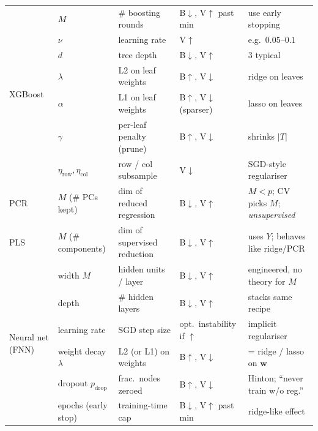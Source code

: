 {\begin{center}
\begin{tabular*}{\textwidth}{@{\extracolsep{\fill}} l l l l l @{}}
\multirow{7}{*}{XGBoost}
                   & $M$                 & \# boosting rounds           & B$\downarrow$, V$\uparrow$ past min  & use early stopping \\
                   & $\nu$               & learning rate                & V$\uparrow$                          & e.g.\ $0.05$--$0.1$ \\
                   & $d$                 & tree depth                   & B$\downarrow$, V$\uparrow$           & $3$ typical \\
                   & $\lambda$           & L2 on leaf weights           & B$\uparrow$, V$\downarrow$           & ridge on leaves \\
                   & $\alpha$            & L1 on leaf weights           & B$\uparrow$, V$\downarrow$ (sparser) & lasso on leaves \\
                   & $\gamma$            & per-leaf penalty (prune)     & B$\uparrow$, V$\downarrow$           & shrinks $|T|$ \\
                   & $\eta_{\text{row}}, \eta_{\text{col}}$ & row / col subsample & V$\downarrow$               & SGD-style regulariser \\
\midrule

PCR                & $M$ (\# PCs kept)   & dim of reduced regression    & B$\downarrow$, V$\uparrow$           & $M{<}p$; CV picks $M$; \emph{unsupervised} \\
\midrule

PLS                & $M$ (\# components) & dim of supervised reduction  & B$\downarrow$, V$\uparrow$           & uses $Y$; behaves like ridge/PCR \\
\midrule

\multirow{6}{*}{Neural net (FNN)}
                   & width $M$           & hidden units / layer         & B$\downarrow$, V$\uparrow$           & engineered, no theory for $M$ \\
                   & depth               & \# hidden layers             & B$\downarrow$, V$\uparrow$           & stacks same recipe \\
                   & learning rate       & SGD step size                & opt.\ instability if $\uparrow$      & implicit regulariser \\
                   & weight decay $\lambda$ & L2 (or L1) on weights     & B$\uparrow$, V$\downarrow$           & = ridge / lasso on $\mathbf w$ \\
                   & dropout $p_{\text{drop}}$ & frac.\ nodes zeroed    & B$\uparrow$, V$\downarrow$           & Hinton; ``never train w/o reg.'' \\
                   & epochs (early stop) & training-time cap            & B$\downarrow$, V$\uparrow$ past min  & ridge-like effect \\
\midrule


\end{tabular*}
\end{center}}
